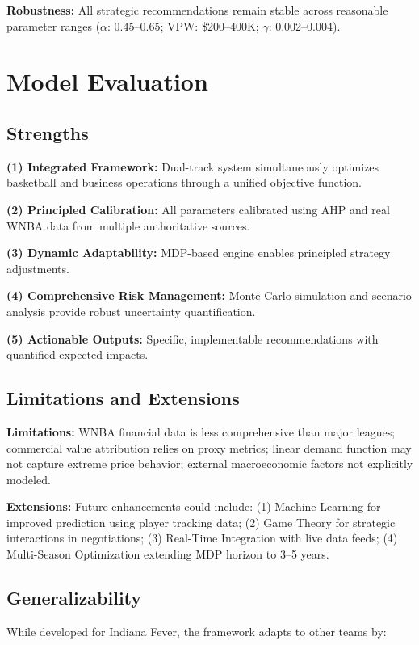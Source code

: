 \documentclass{mcmthesis}
\begin{document}
\textbf{Robustness:} All strategic recommendations remain stable across reasonable parameter ranges ($\alpha$: 0.45--0.65; VPW: \$200--400K; $\gamma$: 0.002--0.004).


\section{Model Evaluation}

\subsection{Strengths}
\textbf{(1) Integrated Framework:} Dual-track system simultaneously optimizes basketball and business operations through a unified objective function. 

\textbf{(2) Principled Calibration:} All parameters calibrated using AHP and real WNBA data from multiple authoritative sources. 

\textbf{(3) Dynamic Adaptability:} MDP-based engine enables principled strategy adjustments. 

\textbf{(4) Comprehensive Risk Management:} Monte Carlo simulation and scenario analysis provide robust uncertainty quantification. 

\textbf{(5) Actionable Outputs:} Specific, implementable recommendations with quantified expected impacts.

\subsection{Limitations and Extensions}
\textbf{Limitations:} WNBA financial data is less comprehensive than major leagues; commercial value attribution relies on proxy metrics; linear demand function may not capture extreme price behavior; external macroeconomic factors not explicitly modeled.

\textbf{Extensions:} Future enhancements could include: (1) Machine Learning for improved prediction using player tracking data; (2) Game Theory for strategic interactions in negotiations; (3) Real-Time Integration with live data feeds; (4) Multi-Season Optimization extending MDP horizon to 3--5 years.

\subsection{Generalizability}

While developed for Indiana Fever, the framework adapts to other teams by:
\end{document}
